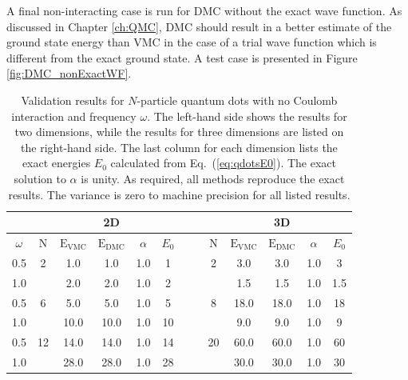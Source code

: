 A final non-interacting case is run for DMC without the exact wave function. As discussed in Chapter \ref{ch:QMC}, DMC should result in a better estimate of the ground state energy than VMC in the case of a trial wave function which is different from the exact ground state. A test case is presented in Figure \ref{fig:DMC_nonExactWF}.

\setlength{\tabcolsep}{0.3cm}
\begin{table}[h]
\begin{center}
\begin{tabular}{c|cccccc||cccccc}
 & & & 2D & & & & & & & 3D \\
\hline
  $\omega$   & N & $\mathrm{E_{VMC}}$ & $\mathrm{E_{DMC}}$ & $\alpha$ & $E_0$ & \qquad  & \qquad &  N   & $\mathrm{E_{VMC}}$ & $\mathrm{E_{DMC}}$ & $\alpha$ & $E_0$ \\
\hline
 0.5 &   2   &   1.0    &   1.0    &   1.0    & 1  & \qquad & \qquad & 2     &   3.0   &   3.0    &   1.0    & 3 \\
 1.0 &       &   2.0    &   2.0    &   1.0    & 2  & \qquad & \qquad &       &   1.5   &   1.5    &   1.0    & 1.5 \\
 0.5 &   6   &   5.0    &   5.0    &   1.0    & 5  & \qquad & \qquad &  8    &   18.0  &   18.0   &   1.0    & 18 \\
 1.0 &       &   10.0   &   10.0   &   1.0    & 10 & \qquad & \qquad &       &  9.0    &   9.0    &   1.0    & 9 \\
 0.5 &   12  &   14.0   &   14.0   &   1.0    & 14 & \qquad & \qquad & 20    &  60.0   &   60.0   &   1.0    & 60 \\
 1.0 &       &   28.0   &   28.0   &   1.0    & 28 & \qquad & \qquad &       &  30.0   &   30.0   &   1.0    & 30 \\
\end{tabular}
\caption{Validation results for $N$-particle quantum dots with no Coulomb interaction and frequency $\omega$. The left-hand side shows the results for two dimensions, while the results for three dimensions are listed on the right-hand side. The last column for each dimension lists the exact energies $E_0$ calculated from Eq.~(\ref{eq:qdotsE0}). The exact solution to $\alpha$ is unity. As required, all methods reproduce the exact results. The variance is zero to machine precision for all listed results.}
\label{tab:res_valid_qdots}
\end{center}
\end{table}
\setlength{\tabcolsep}{6pt}

